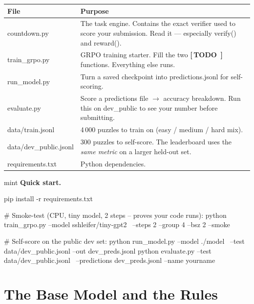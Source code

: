 \documentclass[11pt]{article}
\newcommand{\todotag}[1]{{\sans\footnotesize\color{rose}\textbf{[\,TODO #1\,]}}}
\newcommand{\codesm}[1]{{\ttfamily\footnotesize #1}}
\begin{document}
\begin{center}
\renewcommand{\arraystretch}{1.35}
\begin{tabular}{>{\ttfamily\footnotesize}l p{10.2cm}}
\toprule
\normalfont\textbf{File} & \textbf{Purpose} \\
\midrule
countdown.py     & The task engine. Contains the exact verifier used to score your submission.
                   Read it --- especially \codesm{verify()} and \codesm{reward()}. \\
train\_grpo.py   & GRPO training starter. Fill the two \todotag{} functions. Everything else runs. \\
run\_model.py    & Turn a saved checkpoint into \codesm{predictions.jsonl} for self-scoring. \\
evaluate.py      & Score a predictions file $\to$ accuracy breakdown. Run this on \codesm{dev\_public}
                   to see your number before submitting. \\
data/train.jsonl & 4\,000 puzzles to train on (easy / medium / hard mix). \\
data/dev\_public.jsonl & 300 puzzles to self-score.
                   The leaderboard uses the \emph{same metric} on a larger held-out set. \\
requirements.txt & Python dependencies. \\
\bottomrule
\end{tabular}
\end{center}

\begin{qbox}{mint}
\textbf{Quick start.}
\begin{code}
pip install -r requirements.txt

# Smoke-test (CPU, tiny model, 2 steps -- proves your code runs):
python train_grpo.py --model sshleifer/tiny-gpt2 \
    --steps 2 --group 4 --bsz 2 --smoke

# Self-score on the public dev set:
python run_model.py --model ./model \
    --test data/dev_public.jsonl --out dev_preds.jsonl
python evaluate.py --test data/dev_public.jsonl \
    --predictions dev_preds.jsonl --name yourname
\end{code}
\end{qbox}

\section{The Base Model and the Rules}
\end{document}
